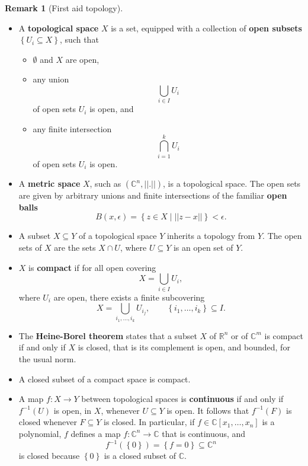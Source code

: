\documentclass{article}
\newcommand{\R}{\mathbb{R}}
\newcommand{\C}{\mathbb{C}}
\newcommand{\rb}[1]{\left( #1 \right)}
\renewcommand{\sb}[1]{\left[ #1 \right]}
\newcommand{\cb}[1]{\left\{ #1 \right\}}
\newcommand{\abs}[1]{\left\lvert #1 \right\rvert}
\theoremstyle{definition}\newtheorem{definition}{Definition}[section]
\theoremstyle{definition}\newtheorem{notation}[definition]{Notation}
\theoremstyle{definition}\newtheorem{remark}[definition]{Remark}
\theoremstyle{definition}\newtheorem{example1}[definition]{Example}
\theoremstyle{definition}\newtheorem{fact}{Fact}
\theoremstyle{definition}\newtheorem{exercise}{Exercise}
\theoremstyle{definition}\newtheorem*{example2}{Example}
\begin{document}
\begin{remark}[First aid topology]
\label{rem:2.19}
\hfill
\begin{itemize}
\item A \textbf{topological space} $ X $ is a set, equipped with a collection of \textbf{open subsets} $ \cb{U_i \subseteq X} $, such that
\begin{itemize}
\item $ \emptyset $ and $ X $ are open,
\item any union
$$ \bigcup_{i \in I} U_i $$
of open sets $ U_i $ is open, and
\item any finite intersection
$$ \bigcap_{i = 1}^k U_i $$
of open sets $ U_i $ is open.
\end{itemize}
\item A \textbf{metric space} $ X $, such as $ \rb{\C^n, \abs{\abs{.}}} $, is a topological space. The open sets are given by arbitrary unions and finite intersections of the familiar \textbf{open balls}
$$ B\rb{x, \epsilon} = \cb{z \in X \mid \abs{\abs{z - x}}} < \epsilon. $$
\item A subset $ X \subseteq Y $ of a topological space $ Y $ inherits a topology from $ Y $. The open sets of $ X $ are the sets $ X \cap U $, where $ U \subseteq Y $ is an open set of $ Y $.
\item $ X $ is \textbf{compact} if for all open covering
$$ X = \bigcup_{i \in I} U_i, $$
where $ U_i $ are open, there exists a finite subcovering
$$ X = \bigcup_{i_1, \dots, i_k} U_{i_j}, \qquad \cb{i_1, \dots, i_k} \subseteq I. $$
\item The \textbf{Heine-Borel theorem} states that a subset $ X $ of $ \R^n $ or of $ \C^m $ is compact if and only if $ X $ is closed, that is its complement is open, and bounded, for the usual norm.
\item A closed subset of a compact space is compact.
\item A map $ f : X \to Y $ between topological spaces is \textbf{continuous} if and only if $ f^{-1}\rb{U} $ is open, in $ X $, whenever $ U \subseteq Y $ is open. It follows that $ f^{-1}\rb{F} $ is closed whenever $ F \subseteq Y $ is closed. In particular, if $ f \in \C\sb{x_1, \dots, x_n} $ is a polynomial, $ f $ defines a map $ f : \C^n \to \C $ that is continuous, and
$$ f^{-1}\rb{\cb{0}} = \cb{f = 0} \subseteq \C^n $$
is closed because $ \cb{0} $ is a closed subset of $ \C $.
\end{itemize}
\end{remark}
\end{document}
